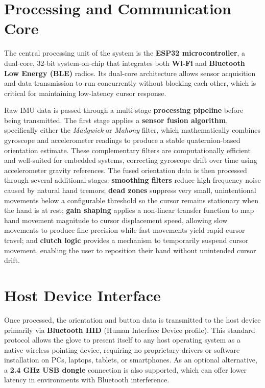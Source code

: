 \section*{Processing and Communication Core}

The central processing unit of the system is the \textbf{ESP32 microcontroller}, a dual-core, 32-bit system-on-chip that integrates both \textbf{Wi-Fi} and \textbf{Bluetooth Low Energy (BLE)} radios. Its dual-core architecture allows sensor acquisition and data transmission to run concurrently without blocking each other, which is critical for maintaining low-latency cursor response.

Raw IMU data is passed through a multi-stage \textbf{processing pipeline} before being transmitted. The first stage applies a \textbf{sensor fusion algorithm}, specifically either the \textit{Madgwick} or \textit{Mahony} filter, which mathematically combines gyroscope and accelerometer readings to produce a stable quaternion-based orientation estimate. These complementary filters are computationally efficient and well-suited for embedded systems, correcting gyroscope drift over time using accelerometer gravity references. The fused orientation data is then processed through several additional stages: \textbf{smoothing filters} reduce high-frequency noise caused by natural hand tremors; \textbf{dead zones} suppress very small, unintentional movements below a configurable threshold so the cursor remains stationary when the hand is at rest; \textbf{gain shaping} applies a non-linear transfer function to map hand movement magnitude to cursor displacement speed, allowing slow movements to produce fine precision while fast movements yield rapid cursor travel; and \textbf{clutch logic} provides a mechanism to temporarily suspend cursor movement, enabling the user to reposition their hand without unintended cursor drift.

\section*{Host Device Interface}

Once processed, the orientation and button data is transmitted to the host device primarily via \textbf{Bluetooth HID} (Human Interface Device profile). This standard protocol allows the glove to present itself to any host operating system as a native wireless pointing device, requiring no proprietary drivers or software installation on PCs, laptops, tablets, or smartphones. As an optional alternative, a \textbf{2.4 GHz USB dongle} connection is also supported, which can offer lower latency in environments with Bluetooth interference.

